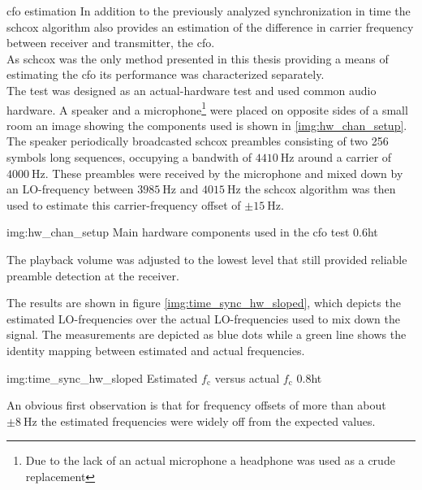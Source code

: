 \begin{subchapter}{\Acrlong{cfo} estimation}
  In addition to the previously analyzed synchronization in time
  the \gls{schcox} algorithm also provides an estimation of
  the difference in carrier frequency between receiver and
  transmitter, the \acrfull{cfo}. \\

  As \gls{schcox} was the only method presented in this thesis
  providing a means of estimating the \gls{cfo}
  its performance was characterized separately. \\

  The test was designed as an actual-hardware test
  and used common audio hardware.
  A speaker and a microphone\footnote{Due to the lack of an actual
  microphone a headphone was used as a crude replacement}
  were placed on opposite
  sides of a small room an image showing the components used
  is shown in \autoref{img:hw_chan_setup}. The speaker periodically broadcasted
  \gls{schcox} preambles consisting of two 256 symbols long
  sequences, occupying a bandwith of $\SI{4410}{\hertz}$
  around a carrier of $\SI{4000}{\hertz}$.
  These preambles were received by the microphone and mixed
  down by an LO-frequency between $\SI{3985}{\hertz}$ and $\SI{4015}{\hertz}$
  the \gls{schcox} algorithm was then used to estimate
  this carrier-frequency offset of $\pm\SI{15}{\hertz}$.

                  {img:hw_chan_setup}
                  {Main hardware components used in the \acrshort{cfo} test}
                  {0.6}{ht}

  The playback volume was adjusted to the lowest level
  that still provided reliable preamble detection at the receiver.

  The results are shown in figure \ref{img:time_sync_hw_sloped},
  which depicts the estimated LO-frequencies over the
  actual LO-frequencies used to mix down the signal.
  The measurements are depicted as blue dots while a
  green line shows the identity mapping between estimated
  and actual frequencies.

                  {img:time_sync_hw_sloped}
                  {Estimated $f_\text{c}$ versus actual $f_\text{c}$}
                  {0.8}{ht}

  An obvious first observation is that for frequency offsets of
  more than about $\pm\SI{8}{\hertz}$ the estimated frequencies
  were widely off from the expected values.


\end{subchapter}
